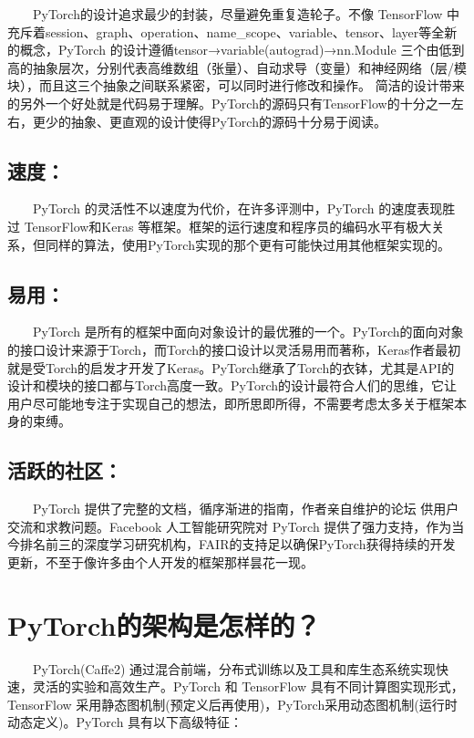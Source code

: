   PyTorch的设计追求最少的封装，尽量避免重复造轮子。不像 TensorFlow
中充斥着session、graph、operation、name\_scope、variable、tensor、layer等全新的概念，PyTorch
的设计遵循tensor→variable(autograd)→nn.Module
三个由低到高的抽象层次，分别代表高维数组（张量）、自动求导（变量）和神经网络（层/模块），而且这三个抽象之间联系紧密，可以同时进行修改和操作。
简洁的设计带来的另外一个好处就是代码易于理解。PyTorch的源码只有TensorFlow的十分之一左右，更少的抽象、更直观的设计使得PyTorch的源码十分易于阅读。

\subsection{速度：}\label{ux901fux5ea6}

  PyTorch 的灵活性不以速度为代价，在许多评测中，PyTorch 的速度表现胜过
TensorFlow和Keras
等框架。框架的运行速度和程序员的编码水平有极大关系，但同样的算法，使用PyTorch实现的那个更有可能快过用其他框架实现的。

\subsection{易用：}\label{ux6613ux7528}

  PyTorch
是所有的框架中面向对象设计的最优雅的一个。PyTorch的面向对象的接口设计来源于Torch，而Torch的接口设计以灵活易用而著称，Keras作者最初就是受Torch的启发才开发了Keras。PyTorch继承了Torch的衣钵，尤其是API的设计和模块的接口都与Torch高度一致。PyTorch的设计最符合人们的思维，它让用户尽可能地专注于实现自己的想法，即所思即所得，不需要考虑太多关于框架本身的束缚。

\subsection{活跃的社区：}\label{ux6d3bux8dc3ux7684ux793eux533a}

  PyTorch 提供了完整的文档，循序渐进的指南，作者亲自维护的论坛
供用户交流和求教问题。Facebook 人工智能研究院对 PyTorch
提供了强力支持，作为当今排名前三的深度学习研究机构，FAIR的支持足以确保PyTorch获得持续的开发更新，不至于像许多由个人开发的框架那样昙花一现。

\section{ PyTorch的架构是怎样的？}\label{pytorch-ux7684ux67b6ux6784ux662fux600eux6837ux7684}

  PyTorch(Caffe2)
通过混合前端，分布式训练以及工具和库生态系统实现快速，灵活的实验和高效生产。PyTorch
和 TensorFlow 具有不同计算图实现形式，TensorFlow
采用静态图机制(预定义后再使用)，PyTorch采用动态图机制(运行时动态定义)。PyTorch
具有以下高级特征：

